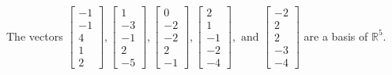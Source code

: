 \begin{exercise}
\begin{exerciseStatement}
  \end{exerciseStatement}
  \begin{exerciseAnswer}
   The vectors \(\left[\begin{array}{r}
-1 \\
-1 \\
4 \\
1 \\
2
\end{array}\right] , \left[\begin{array}{r}
1 \\
-3 \\
-1 \\
2 \\
-5
\end{array}\right] , \left[\begin{array}{r}
0 \\
-2 \\
-2 \\
2 \\
-1
\end{array}\right] , \left[\begin{array}{r}
2 \\
1 \\
-1 \\
-2 \\
-4
\end{array}\right] , \text{ and } \left[\begin{array}{r}
-2 \\
2 \\
2 \\
-3 \\
-4
\end{array}\right]\) 
  	 are  a basis of \(\mathbb{R}^5\).
  


  \end{exerciseAnswer}
\end{exercise}